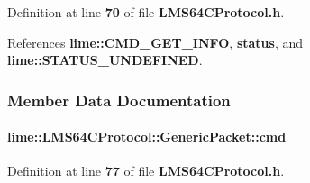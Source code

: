 Definition at line {\bf 70} of file {\bf L\+M\+S64\+C\+Protocol.\+h}.



References {\bf lime\+::\+C\+M\+D\+\_\+\+G\+E\+T\+\_\+\+I\+N\+FO}, {\bf status}, and {\bf lime\+::\+S\+T\+A\+T\+U\+S\+\_\+\+U\+N\+D\+E\+F\+I\+N\+ED}.



\subsubsection{Member Data Documentation}
\paragraph[{cmd}]{ lime\+::\+L\+M\+S64\+C\+Protocol\+::\+Generic\+Packet\+::cmd}\label{structlime_1_1LMS64CProtocol_1_1GenericPacket_a89c04be82fe54cd00add60fdba004db1}


Definition at line {\bf 77} of file {\bf L\+M\+S64\+C\+Protocol.\+h}.



